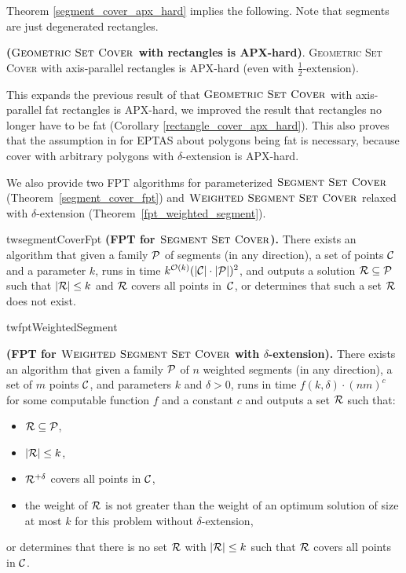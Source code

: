 Theorem \ref{segment_cover_apx_hard} implies the following.
Note that segments are just degenerated rectangles.

\begin{corollary}{
\label{rectangle_cover_apx_hard}
	\textbf{($\textsc{Geometric Set Cover}$ with rectangles is APX-hard)}.	
	\textsc{Geometric} \textsc{Set} \textsc{Cover}
	with axis-parallel rectangles is APX-hard (even with $\frac{1}{2}$-extension).
}\end{corollary}

This expands the previous result of \cite{rectangles_apx_hard} 
that $\textsc{Geometric Set Cover}$
with axis-parallel fat rectangles is APX-hard,
we improved the result that rectangles no longer
have to be fat (Corollary \ref{rectangle_cover_apx_hard}).
This also proves that the assumption in \cite{harpeled12}
for EPTAS about polygons being fat is necessary, because
cover with arbitrary polygons with $\delta$-extension is APX-hard.

We also provide two FPT algorithms for parameterized $\textsc{Segment Set Cover}$ 	
(Theorem~\ref{segment_cover_fpt})
and $\textsc{Weighted Segment Set Cover}$ relaxed with $\delta$-extension
(Theorem~\ref{fpt_weighted_segment}).

\begin{restatable}{tw}{segmentCoverFpt}{
	\label{segment_cover_fpt}
	\textbf{(FPT for $\textsc{Segment Set Cover}$).}
	There exists an algorithm that given a family $\mathcal{P}$ of
	segments (in any direction),
	a set of points $\mathcal{C}$
	and a parameter $k$,
	runs in time ${k^{\mathcal{O}(k)} (|\mathcal{C}|\cdot|\mathcal{P}|)^2}$,
	and outputs a solution $\mathcal{R} \subseteq \mathcal{P}$
	such that $|\mathcal{R}| \le k$ and $\mathcal{R}$ covers all points in~$\mathcal{C}$,
	or determines that such a set $\mathcal{R}$ does not exist.
}\end{restatable}

\begin{restatable}{tw}{fptWeightedSegment}{
	\label{fpt_weighted_segment}
	\textbf{(FPT for $\textsc{Weighted Segment Set Cover}$ with $\delta$-extension).}
	There exists an algorithm that given a family $\mathcal{P}$ of
	$n$ weighted segments (in any direction),
	a set of $m$ points $\mathcal{C}$, and parameters $k$ and $\delta > 0$,
	runs in time $f(k, \delta) \cdot (nm)^c$ for some computable function $f$ and a constant $c$ and
	outputs a set $\mathcal{R}$ such that:
	\begin{itemize}
	\item $\mathcal{R} \subseteq \mathcal{P}$,
	\item $|\mathcal{R}| \le k$,
	\item $\mathcal{R}^{+\delta}$ covers all points in $\mathcal{C}$,
	\item the weight of $\mathcal{R}$ is not greater than the weight
	of an optimum solution of size at most $k$
	for this problem without $\delta$-extension,
	\end{itemize}
	or determines that there is no set $\mathcal{R}$ with $|\mathcal{R}| \le k$
	such that $\mathcal{R}$ covers all points in $\mathcal{C}$.
}\end{restatable}

